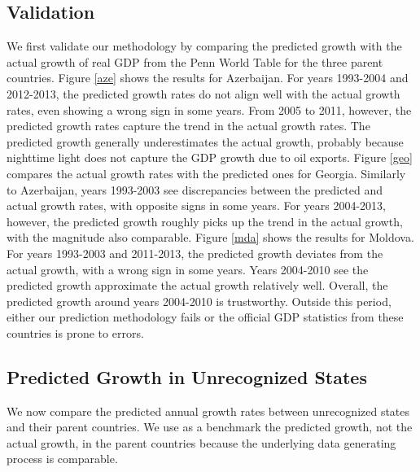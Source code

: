 \documentclass[12pt,a4paper]{article}%
\begin{document}
\subsection{Validation}
We first validate our methodology by comparing the predicted growth with the actual growth of real GDP from the Penn World Table for the three parent countries. 
Figure \ref{aze} shows the results for Azerbaijan.
For years 1993-2004 and 2012-2013, the predicted growth rates do not align well with the actual growth rates, even showing a wrong sign in some years. 
From 2005 to 2011, however, the predicted growth rates capture the trend in the actual growth rates. 
The predicted growth generally underestimates the actual growth, probably because nighttime light does not capture the GDP growth due to oil exports.
Figure \ref{geo} compares the actual growth rates with the predicted ones for Georgia. 
Similarly to Azerbaijan, years 1993-2003 see discrepancies between the predicted and actual growth rates, with opposite signs in some years. 
For years 2004-2013, however, the predicted growth roughly picks up the trend in the actual growth, with the magnitude also comparable.
Figure \ref{mda} shows the results for Moldova.
For years 1993-2003 and 2011-2013, the predicted growth deviates from the actual growth, with a wrong sign in some years.
Years 2004-2010 see the predicted growth approximate the actual growth relatively well.
Overall, the predicted growth around years 2004-2010 is trustworthy. Outside this period, either our prediction methodology fails or the official GDP statistics from these countries is prone to errors.

\subsection{Predicted Growth in Unrecognized States}
We now compare the predicted annual growth rates between unrecognized states and their parent countries. 
We use as a benchmark the predicted growth, not the actual growth, in the parent countries because the underlying data generating process is comparable.
\end{document}
